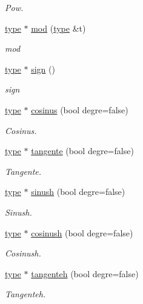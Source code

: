 \begin{DoxyCompactItemize}
\begin{DoxyCompactList}\small\item\em Pow. \end{DoxyCompactList}\item 
\hyperlink{classtype}{type} $\ast$ \hyperlink{class_expression_ac46a4b88a1b08206e08da229fdbfd3e9}{mod} (\hyperlink{classtype}{type} \&t)
\begin{DoxyCompactList}\small\item\em mod \end{DoxyCompactList}\item 
\hyperlink{classtype}{type} $\ast$ \hyperlink{class_expression_aa654b4e71cfafd29af080020a77dc1e0}{sign} ()
\begin{DoxyCompactList}\small\item\em sign \end{DoxyCompactList}\item 
\hyperlink{classtype}{type} $\ast$ \hyperlink{class_expression_ab33831fb9207ba778ae46f49b2f0f7ac}{cosinus} (bool degre=false)
\begin{DoxyCompactList}\small\item\em Cosinus. \end{DoxyCompactList}\item 
\hyperlink{classtype}{type} $\ast$ \hyperlink{class_expression_ae47f82ffeefff823064141174ba5c3ac}{tangente} (bool degre=false)
\begin{DoxyCompactList}\small\item\em Tangente. \end{DoxyCompactList}\item 
\hyperlink{classtype}{type} $\ast$ \hyperlink{class_expression_a45aef44cb37e21e99614053bf80801f6}{sinush} (bool degre=false)
\begin{DoxyCompactList}\small\item\em Sinush. \end{DoxyCompactList}\item 
\hyperlink{classtype}{type} $\ast$ \hyperlink{class_expression_a032591ce129e8d11b9a75c55287323d8}{cosinush} (bool degre=false)
\begin{DoxyCompactList}\small\item\em Cosinush. \end{DoxyCompactList}\item 
\hyperlink{classtype}{type} $\ast$ \hyperlink{class_expression_a0d0acd016a909609e451836060d4e676}{tangenteh} (bool degre=false)
\begin{DoxyCompactList}\small\item\em Tangenteh. \end{DoxyCompactList}\item 

\end{DoxyCompactItemize}

